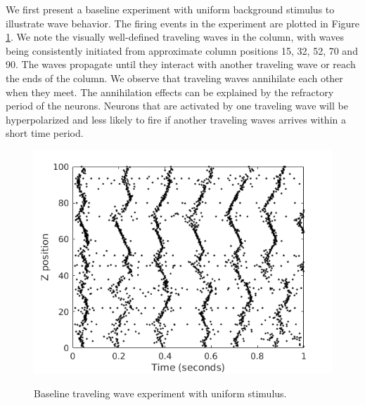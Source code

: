 \documentclass[a4paper,11pt]{article}
\begin{document}
We first present a baseline experiment with uniform background stimulus to illustrate wave behavior. 
The firing events in the experiment are plotted in Figure \ref{fig:baseline}.
We note the visually well-defined traveling waves in the column, with waves being consistently initiated from approximate column positions 15, 32, 52, 70 and 90.
The waves propagate until they interact with another traveling wave or reach the ends of the column.
We observe that traveling waves annihilate each other when they meet.
The annihilation effects can be explained by the refractory period of the neurons.
Neurons that are activated by one traveling wave will be hyperpolarized and less likely to fire if another traveling waves arrives within a short time period.
\begin{figure}[!htb]
 \centering
 \caption{Baseline traveling wave experiment with uniform stimulus.}
 \includegraphics[width=\textwidth]{fig/baseline}
 \label{fig:baseline}
\end{figure}
\end{document}
